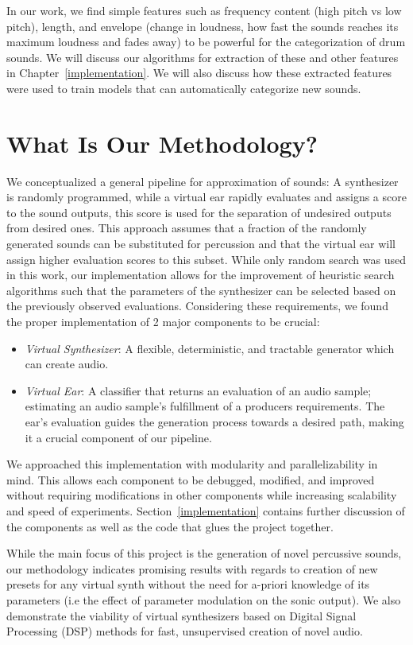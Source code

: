 \documentclass[\main/thesis.tex]{subfiles}
\begin{document}
In our work, we find simple features such as frequency content (high pitch vs low pitch), length, and envelope (change in loudness, how fast the sounds reaches its maximum loudness and fades away) to be powerful for the categorization of drum sounds. We will discuss our algorithms for extraction of these and other features in Chapter~\ref{implementation}. We will also discuss how these extracted features were used to train models that can automatically categorize new sounds.  
\section{What Is Our Methodology?}
\label{sec_methodology}
We conceptualized a general pipeline for approximation of sounds: A synthesizer is randomly programmed, while a virtual ear rapidly evaluates and assigns a score to the sound outputs, this score is used for the separation of undesired outputs from desired ones. This approach assumes that a fraction of the randomly generated sounds can be substituted for percussion and that the virtual ear will assign higher evaluation scores to this subset. While only random search was used in this work, our implementation allows for the improvement of heuristic search algorithms such that the parameters of the synthesizer can be selected based on the previously observed evaluations. Considering these requirements, we found the proper implementation of 2 major components to be crucial:

\begin{itemize}
    \item \textit{Virtual Synthesizer}: A flexible, deter\-min\-istic, and tract\-able gener\-ator which can create audio. 
    \item \textit{Virtual Ear}: A classifier that returns an evaluation of an audio sample; estimating an audio sample's fulfillment of a producers requirements. The ear's evaluation guides the generation process towards a desired path, making it a crucial component of our pipeline. 
\end{itemize}

We approached this implementation with modularity and parallelizability in mind. This allows each component to be debugged, modified, and improved without requiring modifications in other components while increasing scalability and speed of experiments. 
Section~\ref{implementation} contains further discussion of the components as well as the code that glues the project together.

While the main focus of this project is the generation of novel percussive sounds, our methodology indicates promising results with regards to creation of new presets for any virtual synth without the need for a-priori knowledge of its parameters (i.e the effect of parameter modulation on the sonic output). We also demonstrate the viability of virtual synthesizers based on Digital Signal Processing (DSP) methods for fast, unsupervised creation of novel audio. 
\end{document}
